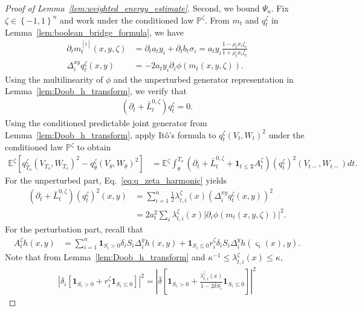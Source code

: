 \documentclass[11pt]{article}
\newcommand{\flip}{\varsigma}
\newcommand{\btau}{\kappa}
\newcommand{\bdelta}{\bar{\delta}}
\newcommand{\stopT}{{\boldsymbol{\mathfrak{T}}}}
\newcommand{\uV}{V}
\newcommand{\uW}{W}
\newcommand{\To}{{T_o}}
\newcommand{\jL}{\bar{L}}
\theoremstyle{named}
\theoremstyle{plain}
\newcommand{\Exs}{\ensuremath{{\mathbb{E}}}}
\newcommand{\Prob}{\ensuremath{{\mathbb{P}}}}
\newcommand{\brackets}[1]{\left[ #1 \right]}
\newcommand{\parenth}[1]{\left( #1 \right)}
\newcommand{\braces}[1]{\left\{ #1 \right \}}
\newcommand{\abss}[1]{\left| #1 \right |}
\begin{document}
\begin{proof}[Proof of Lemma~\ref{lem:weighted_energy_estimate}]
  Second, we bound $\Psi_a$. Fix $\zeta \in \braces{-1,1}^n$ and work under the conditioned law $\Prob^\zeta$. From $m_t$ and $q_t^{\zeta}$ in Lemma~\ref{lem:boolean_bridge_formula}, we have
  \begin{align*}
    \partial_t m_t^{[i]}(x, y, \zeta) &= \partial_t a_t y_i + \partial_t b_t \sigma_i = a_t y_i \frac{1-\rho_t x_i \zeta_i}{1+\rho_t x_i \zeta_i} \\
    \Delta_i^{xy} q_t^{\zeta}(x, y) & = - 2 a_t y_i \partial_i \phi(m_t(x, y, \zeta)).
  \end{align*}
  Using the multilinearity of $\phi$ and the unperturbed generator representation in Lemma~\ref{lem:Doob_h_transform}, we verify that
  \begin{align}
    \label{eq:q_zeta_harmonic}
    \parenth{\partial_t + \jL_t^{0, \zeta}} q_t^{\zeta} = 0.
  \end{align}
  Using the conditioned predictable joint generator from
  Lemma~\ref{lem:Doob_h_transform}, apply It\^o's formula to $q_{t}^{\zeta}(\uV_t, \uW_t)^2$ under the conditioned law $\Prob^\zeta$ to obtain
  \begin{align}
    \label{eq:q_zeta_sq_ito}
    \Exs^{\zeta} \brackets{q_{\To}^{\zeta}(\uV_{\To}, \uW_{\To})^2 - q_{\theta}^{\zeta}(\uV_\theta, \uW_\theta)^2} &= \Exs^{\zeta} \int_\theta^{\To} \parenth{\partial_t + \jL_t^{0, \zeta} + \mathbf{1}_{t \leq \stopT} A_t^{\zeta}} \parenth{q_{t}^{\zeta}}^2 (\uV_{t-}, \uW_{t-}) dt.
  \end{align}
  For the unperturbed part, Eq.~\eqref{eq:q_zeta_harmonic} yields
  \begin{align*}
    \parenth{\partial_t + \jL_t^{0, \zeta}} \parenth{q_{t}^{\zeta}}^2 (x, y) &= \sum_{i=1}^n \frac12 \lambda_{t, i}^{\zeta}(x) \parenth{\Delta_i^{xy} q_{t}^{\zeta} (x, y)}^2 \\
    &= 2 a_t^2\sum_{i} \lambda_{t, i}^{\zeta}(x) \abss{\partial_i \phi(m_t(x, y, \zeta))}^2.
  \end{align*}
  For the perturbation part, recall that 
  \begin{align*}
    A_t^\zeta h(x, y) &= \sum_{i=1}^n  \mathbf{1}_{S_i > 0}  \delta_i  S_i \Delta_{i}^y h(x, y)  + \mathbf{1}_{S_i \leq 0} r_{i}^{\zeta} \delta_i  S_i  \Delta_i^y h(\flip_i(x), y).
  \end{align*}
  Note that from Lemma~\ref{lem:Doob_h_transform} and $\btau^{-1} \leq \lambda_{t, i}^{\zeta}(x) \leq \btau$,
  \begin{align*}
    \abss{\delta_i \brackets{\mathbf{1}_{S_i > 0} + r_i^{\zeta} \mathbf{1}_{S_i \leq 0} }}^2 = \abss{\bdelta \brackets{\mathbf{1}_{S_i > 0} + \frac{\lambda_{t, i}^{\zeta}(x)}{1 - 2 \bdelta S_i} \mathbf{1}_{S_i \leq 0}}}^2

\end{align*}
\end{proof}
\end{document}
